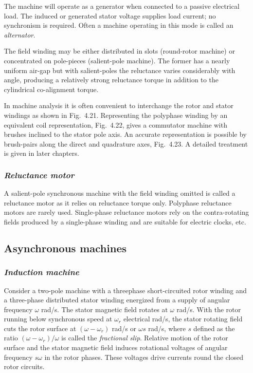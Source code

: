 \documentclass[a4paper,numbers=noenddot,12pt]{scrbook}
\begin{document}
            The machine will operate as a generator when connected to a passive electrical load. The induced or generated stator voltage supplies load current; no synchronism is required. Often a machine operating in this mode is called an \textit{alternator}.

            The field winding may be either distributed in slots (round-rotor machine) or concentrated on pole-pieces (salient-pole machine). The former has a nearly uniform air-gap but with salient-poles the reluctance varies considerably with angle, producing a relatively strong reluctance torque in addition to the cylindrical co-alignment torque.

            In machine analysis it is often convenient to interchange the rotor and stator windings as shown in Fig.\ 4.21. Representing the poly­phase winding by an equivalent coil representation, Fig.\ 4.22, gives a commutator machine with brushes inclined to the stator pole axis. An accurate representation is possible by brush-pairs along the direct and quadrature axes, Fig.\ 4.23. A detailed treatment is given in later chapters.  

            \subsubsection{\textit{Reluctance motor}}
            A salient-pole synchronous machine with the field winding omitted is called a reluctance motor as it relies on reluctance torque only. Polyphase reluctance motors are rarely used. Single-phase reluctance motors rely on the contra-rotating fields produced by a single-phase winding and are suitable for electric clocks, etc.

            \subsection{Asynchronous machines}
            \subsubsection{\textit{Induction machine}}
            Consider a two-pole machine with a three­phase short-circuited rotor winding and a three-phase distributed stator winding energized from a supply of angular frequency $\omega$ rad/s. The stator magnetic field rotates at $\omega$ rad/s. With the rotor running below synchronous speed at $\omega_r$ electrical rad/s, the stator rotating field cuts the rotor surface at $(\omega - \omega_r)$ rad/s or $\omega s$ rad/s, where $s$ defined as the ratio
            $(\omega - \omega_r)/\omega$ is called the \textit{fractional slip}. Relative motion of the rotor surface and the stator magnetic field induces rotational voltages of angular frequency $s \omega$ in the rotor phases. These voltages drive currents round the closed rotor circuits.
\end{document}
